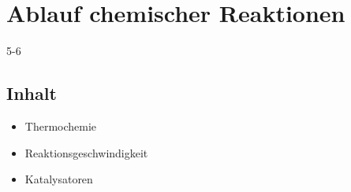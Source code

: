 \section{Ablauf chemischer Reaktionen} {5-6}

\subsection{Inhalt}
\begin{itemize}
\item Thermochemie
\item Reaktionsgeschwindigkeit
\item  Katalysatoren
\end{itemize}
